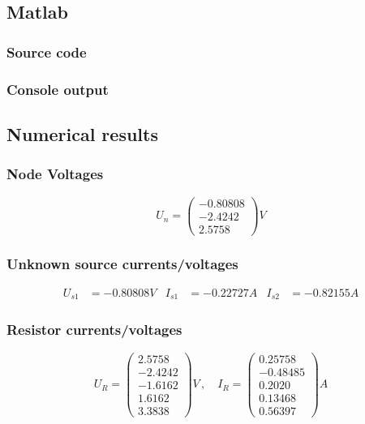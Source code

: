 \documentclass[a4paper]{article}
\begin{document}
\subsection{Matlab}
\subsubsection{Source code}
  
\subsubsection{Console output}
  
\subsection{Numerical results}
\subsubsection{Node Voltages}
\begin{equation*}
   U_n = 
   \begin{pmatrix}
      -0.80808 \\ -2.4242 \\ 2.5758
   \end{pmatrix}
   V
\end{equation*}
\subsubsection{Unknown source currents/voltages}
\begin{align*}
   U_{s1} &= -0.80808 V &
   I_{s1} &= -0.22727 A &
   I_{s2} &= -0.82155 A
\end{align*}   
\subsubsection{Resistor currents/voltages}
\begin{equation*}
   U_R =
   \begin{pmatrix}
      2.5758\\ -2.4242\\ -1.6162\\ 1.6162 \\ 3.3838
   \end{pmatrix}
   V\,, \quad
   I_R =
   \begin{pmatrix}
      0.25758\\ -0.48485\\ 0.2020\\ 0.13468 \\ 0.56397
   \end{pmatrix}
   A
\end{equation*}
\end{document}

